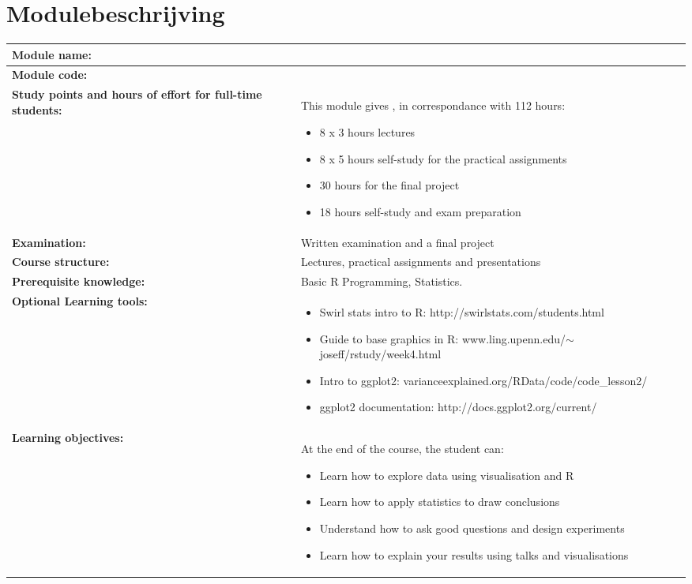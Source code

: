 \section*{Modulebeschrijving}
\begin{tabularx}{\textwidth}{|>{\columncolor{lichtGrijs}} p{}|X|}
	\hline
	\textbf{Module name:} & \modulenaam\\
	\hline
	\textbf{Module code: }& \modulecode\\
	\hline
	\textbf{Study points \newline and hours of effort for full-time students:} & This module gives \stdPunten, in correspondance with 112 hours:
	\begin{itemize}
		\item 8 x 3 hours lectures
		\item 8 x 5 hours self-study for the practical assignments
                  \item 30 hours for the final project
		\item 18 hours self-study and exam preparation
	\end{itemize} \\
	\hline
	\textbf{Examination:} & Written examination and a final project \\
	\hline
	\textbf{Course structure:} & Lectures, practical assignments and presentations \\
	\hline
	\textbf{Prerequisite knowledge:} & Basic R Programming, Statistics. \\
	\hline
	\textbf{Optional Learning tools:}  &
		\begin{itemize}
                  \item Swirl stats intro to R: http://swirlstats.com/students.html
                  \item Guide to base graphics in R: www.ling.upenn.edu/$\sim$joseff/rstudy/week4.html
                    \item Intro to ggplot2: varianceexplained.org/RData/code/code\_lesson2/
                      \item ggplot2 documentation: http://docs.ggplot2.org/current/
		\end{itemize} \\
	\hline
	\textbf{Learning objectives:} &
		At the end of the course, the student can:
			\begin{itemize}
                        \item Learn how to explore data using visualisation and R
                        \item Learn how to apply statistics to draw conclusions
                        \item Understand how to ask good questions and design experiments
                        \item Learn how to explain your results using talks and visualisations
			\end{itemize} \\
		
	\hline
\end{tabularx}
\newpage

